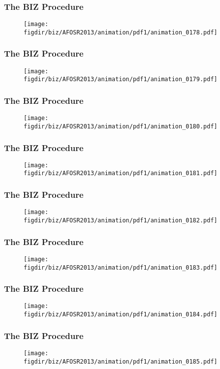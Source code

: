 \documentclass[13pt]{beamer}
\newcommand{\figdir}{../../fig}
\begin{document}
{\begin{frame}\frametitle{The BIZ Procedure}\begin{figure}\texttt{[image: \\figdir/biz/AFOSR2013/animation/pdf1/animation\_0178.pdf]}\end{figure}\end{frame}
\begin{frame}\frametitle{The BIZ Procedure}\begin{figure}\texttt{[image: \\figdir/biz/AFOSR2013/animation/pdf1/animation\_0179.pdf]}\end{figure}\end{frame}
\begin{frame}\frametitle{The BIZ Procedure}\begin{figure}\texttt{[image: \\figdir/biz/AFOSR2013/animation/pdf1/animation\_0180.pdf]}\end{figure}\end{frame}
\begin{frame}\frametitle{The BIZ Procedure}\begin{figure}\texttt{[image: \\figdir/biz/AFOSR2013/animation/pdf1/animation\_0181.pdf]}\end{figure}\end{frame}
\begin{frame}\frametitle{The BIZ Procedure}\begin{figure}\texttt{[image: \\figdir/biz/AFOSR2013/animation/pdf1/animation\_0182.pdf]}\end{figure}\end{frame}
\begin{frame}\frametitle{The BIZ Procedure}\begin{figure}\texttt{[image: \\figdir/biz/AFOSR2013/animation/pdf1/animation\_0183.pdf]}\end{figure}\end{frame}
\begin{frame}\frametitle{The BIZ Procedure}\begin{figure}\texttt{[image: \\figdir/biz/AFOSR2013/animation/pdf1/animation\_0184.pdf]}\end{figure}\end{frame}
\begin{frame}\frametitle{The BIZ Procedure}\begin{figure}\texttt{[image: \\figdir/biz/AFOSR2013/animation/pdf1/animation\_0185.pdf]}\end{figure}\end{frame}
}
\end{document}
